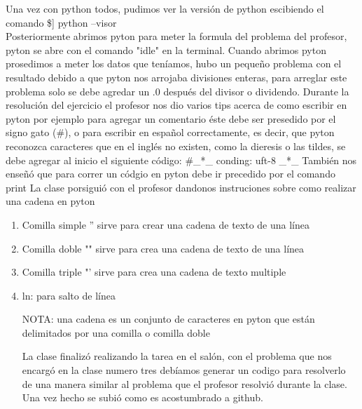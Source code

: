 \documentclass{book}
\begin{document}
\begin{enumerate}
Una vez con python todos, pudimos ver la versión de python escibiendo el comando \$] python --visor\\
Posteriormente abrimos pyton para meter la formula del problema del profesor, pyton se abre con el comando "idle" en la terminal. Cuando abrimos pyton prosedimos a meter los datos que teníamos, hubo un pequeño problema con el resultado debido a que pyton nos arrojaba divisiones enteras, para arreglar este problema solo se debe agredar un .0 después del divisor o dividendo. 
Durante la resolución del ejercicio el profesor nos dio varios tips acerca de como escribir en pyton por ejemplo para agregar un comentario éste debe ser presedido por el signo gato (\#), o para escribir en español correctamente, es decir, que pyton reconozca caracteres que en el inglés no existen, como la dieresis o las tildes, se debe agregar al inicio el siguiente código: \#\_*\_ conding: uft-8 \_*\_
También nos enseñó que para correr un códgio en pyton debe ir precedido por el comando print
La clase porsiguió con el profesor dandonos instruciones sobre como realizar una cadena en pyton  
\begin{enumerate}
	\item Comilla simple '' sirve para crear una cadena de texto de una línea
	\item Comilla doble "" sirve para crea una cadena de texto de una línea
	\item Comilla triple "' sirve para crea una cadena de texto multiple
	\item ln: para salto de línea
	
	NOTA: una cadena es un conjunto de caracteres en pyton que están delimitados por una comilla o comilla doble
	
	La clase finalizó realizando la tarea en el salón, con el problema que nos encargó en la clase numero tres debíamos generar un codigo para resolverlo de una manera similar al problema que el profesor resolvió durante la clase. Una vez hecho se subió como es acostumbrado a github.


\end{enumerate}
\end{enumerate}
\end{document}
